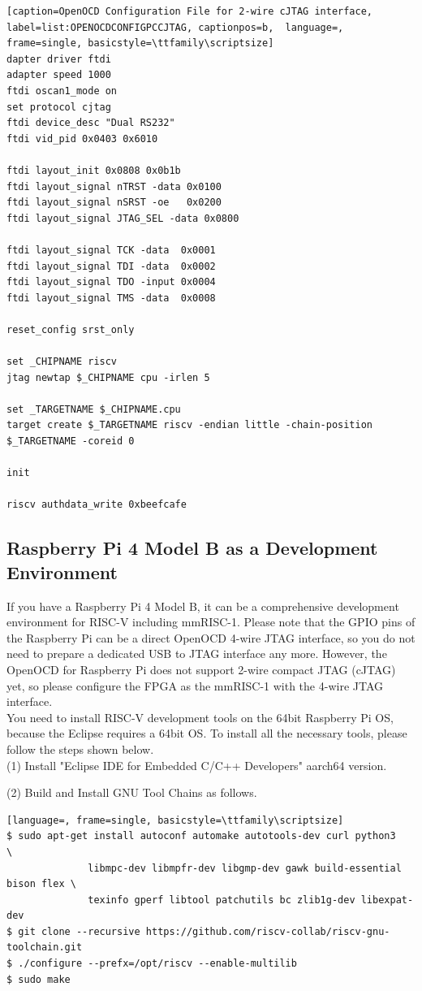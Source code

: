 \begin{lstlisting}[caption=OpenOCD Configuration File for 2-wire cJTAG interface, label=list:OPENOCDCONFIGPCCJTAG, captionpos=b,  language=, frame=single, basicstyle=\ttfamily\scriptsize]
dapter driver ftdi
adapter speed 1000
ftdi oscan1_mode on
set protocol cjtag
ftdi device_desc "Dual RS232"
ftdi vid_pid 0x0403 0x6010

ftdi layout_init 0x0808 0x0b1b
ftdi layout_signal nTRST -data 0x0100
ftdi layout_signal nSRST -oe   0x0200
ftdi layout_signal JTAG_SEL -data 0x0800

ftdi layout_signal TCK -data  0x0001
ftdi layout_signal TDI -data  0x0002
ftdi layout_signal TDO -input 0x0004
ftdi layout_signal TMS -data  0x0008

reset_config srst_only

set _CHIPNAME riscv
jtag newtap $_CHIPNAME cpu -irlen 5

set _TARGETNAME $_CHIPNAME.cpu
target create $_TARGETNAME riscv -endian little -chain-position $_TARGETNAME -coreid 0

init

riscv authdata_write 0xbeefcafe
\end{lstlisting}


\subsection{Raspberry Pi 4 Model B as a Development Environment}

If you have a Raspberry Pi 4 Model B, it can be a comprehensive development environment for RISC-V including mmRISC-1. Please note that the GPIO pins of the Raspberry Pi can be a direct OpenOCD 4-wire JTAG interface, so you do not need to prepare a dedicated USB to JTAG interface any more. However, the OpenOCD for Raspberry Pi does not support 2-wire compact JTAG (cJTAG) yet, so please configure the FPGA as the mmRISC-1 with the 4-wire JTAG interface.\\
You need to install RISC-V development tools on the 64bit Raspberry Pi OS, because the Eclipse requires a 64bit OS. To install all the necessary tools, please follow the steps shown below.\\

(1) Install "Eclipse IDE for Embedded C/C++ Developers" aarch64 version.

(2) Build and Install GNU Tool Chains as follows.

\begin{lstlisting}[language=, frame=single, basicstyle=\ttfamily\scriptsize]
$ sudo apt-get install autoconf automake autotools-dev curl python3             \
              libmpc-dev libmpfr-dev libgmp-dev gawk build-essential bison flex \
              texinfo gperf libtool patchutils bc zlib1g-dev libexpat-dev
$ git clone --recursive https://github.com/riscv-collab/riscv-gnu-toolchain.git
$ ./configure --prefx=/opt/riscv --enable-multilib
$ sudo make
\end{lstlisting}

